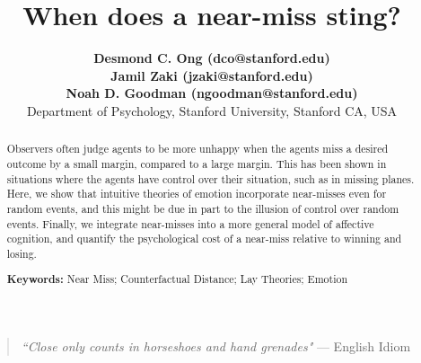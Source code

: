 \documentclass[10pt,letterpaper]{article}
\title{ When does a near-miss sting? }
\author{{\large \bf Desmond C. Ong (dco@stanford.edu)} \\
{\large \bf Jamil Zaki (jzaki@stanford.edu)} \\
{\large \bf Noah D. Goodman (ngoodman@stanford.edu)} \\
  Department of Psychology, Stanford University, Stanford CA, USA 
}
\begin{document}
\maketitle

\begin{abstract}
Observers often judge agents to be more unhappy when the agents miss a desired outcome by a small margin, compared to a large margin. This has been shown in situations where the agents have control over their situation, such as in missing planes. Here, we show that intuitive theories of emotion incorporate near-misses even for random events, and this might be due in part to the illusion of control over random events. Finally, we integrate near-misses into a more general model of affective cognition, and quantify the psychological cost of a near-miss relative to winning and losing.



\textbf{Keywords:} 
Near Miss; Counterfactual Distance; Lay Theories; Emotion
\end{abstract}


\begin{quote}
\textit{``Close only counts in horseshoes and hand grenades"} 
--- English Idiom
\end{quote}

\end{document}
